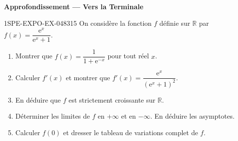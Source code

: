 \begin{center}\textbf{Approfondissement — Vers la Terminale}\end{center}
\begin{exercice}{1SPE-EXPO-EX-048}{3}{15}
On considère la fonction $f$ définie sur $\mathbb{R}$ par $f(x) = \dfrac{\mathrm{e}^x}{\mathrm{e}^x + 1}$.
\begin{enumerate}
\item Montrer que $f(x) = \dfrac{1}{1 + \mathrm{e}^{-x}}$ pour tout réel $x$.
\item Calculer $f'(x)$ et montrer que $f'(x) = \dfrac{\mathrm{e}^x}{(\mathrm{e}^x + 1)^2}$.
\item En déduire que $f$ est strictement croissante sur $\mathbb{R}$.
\item Déterminer les limites de $f$ en $+\infty$ et en $-\infty$. En déduire les asymptotes.
\item Calculer $f(0)$ et dresser le tableau de variations complet de $f$.
\end{enumerate}
\end{exercice}
